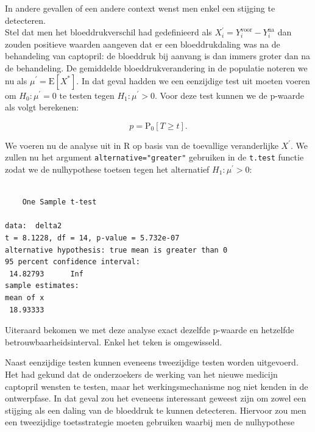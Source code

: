 \documentclass[
  dutch,
  letterpaper,
  12pt]{book}
\newenvironment{Shaded}{\begin{snugshade}}{\end{snugshade}}
\newcommand{\AttributeTok}[1]{\textcolor[rgb]{0.40,0.45,0.13}{#1}}
\newcommand{\FunctionTok}[1]{\textcolor[rgb]{0.28,0.35,0.67}{#1}}
\newcommand{\NormalTok}[1]{\textcolor[rgb]{0.00,0.23,0.31}{#1}}
\newcommand{\OtherTok}[1]{\textcolor[rgb]{0.00,0.23,0.31}{#1}}
\newcommand{\SpecialCharTok}[1]{\textcolor[rgb]{0.37,0.37,0.37}{#1}}
\newcommand{\StringTok}[1]{\textcolor[rgb]{0.13,0.47,0.30}{#1}}
\theoremstyle{definition}
\theoremstyle{definition}
\theoremstyle{definition}
\theoremstyle{remark}
\begin{document}
In andere gevallen of een andere context wenst men enkel een stijging te
detecteren.\\
Stel dat men het bloeddrukverschil had gedefinieerd als
\(X_{i}^\prime=Y_{i}^\text{voor}-Y_{i}^\text{na}\) dan zouden positieve
waarden aangeven dat er een bloeddrukdaling was na de behandeling van
captopril: de bloeddruk bij aanvang is dan immers groter dan na de
behandeling. De gemiddelde bloeddrukverandering in de populatie noteren
we nu als \(\mu^\prime=\text{E}[X^*]\). In dat geval hadden we een
eenzijdige test uit moeten voeren om \(H_0: \mu^\prime=0\) te testen
tegen \(H_1: \mu^\prime>0\). Voor deze test kunnen we de p-waarde als
volgt berekenen:

\[p=\text{P}_0\left[T\geq t\right].\]

We voeren nu de analyse uit in R op basis van de toevallige
veranderlijke \(X^\prime\). We zullen nu het argument
\texttt{alternative="greater"} gebruiken in de \texttt{t.test} functie
zodat we de nulhypothese toetsen tegen het alternatief
\(H_1: \mu^\prime>0\):

\begin{Shaded}
\end{Shaded}

\begin{verbatim}

    One Sample t-test

data:  delta2
t = 8.1228, df = 14, p-value = 5.732e-07
alternative hypothesis: true mean is greater than 0
95 percent confidence interval:
 14.82793      Inf
sample estimates:
mean of x 
 18.93333 
\end{verbatim}

Uiteraard bekomen we met deze analyse exact dezelfde p-waarde en
hetzelfde betrouwbaarheidsinterval. Enkel het teken is omgewisseld.

Naast eenzijdige testen kunnen eveneens tweezijdige testen worden
uitgevoerd. Het had gekund dat de onderzoekers de werking van het nieuwe
medicijn captopril wensten te testen, maar het werkingsmechanisme nog
niet kenden in de ontwerpfase. In dat geval zou het eveneens interessant
geweest zijn om zowel een stijging als een daling van de bloeddruk te
kunnen detecteren. Hiervoor zou men een tweezijdige toetsstrategie
moeten gebruiken waarbij men de nulhypothese
\end{document}
